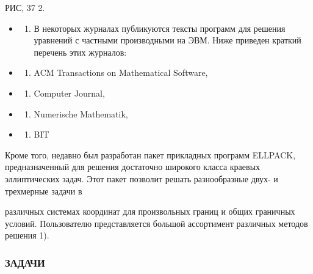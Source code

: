 \documentclass[
  ukrainian,
]{article}
\providecommand{\tightlist}{%
  \setlength{\itemsep}{0pt}\setlength{\parskip}{0pt}}
\begin{document}
РИС, 37 2.

\begin{itemize}
\tightlist
\item
  \begin{enumerate}
  \def\labelenumi{\arabic{enumi}.}
  \setcounter{enumi}{6}
  \tightlist
  \item
    В некоторых журналах публикуются тексты программ для решения
    уравнений с частными производными на ЭВМ. Ниже приведен краткий
    перечень этих журналов:
  \end{enumerate}
\item
  \begin{enumerate}
  \def\labelenumi{\alph{enumi})}
  \tightlist
  \item
    ACM Transactions on Mathematical Software,
  \end{enumerate}
\item
  \begin{enumerate}
  \def\labelenumi{\arabic{enumi})}
  \setcounter{enumi}{5}
  \tightlist
  \item
    Computer Journal,
  \end{enumerate}
\item
  \begin{enumerate}
  \def\labelenumi{\Alph{enumi})}
  \setcounter{enumi}{1}
  \tightlist
  \item
    Numerische Mathematik,
  \end{enumerate}
\item
  \begin{enumerate}
  \def\labelenumi{\alph{enumi})}
  \setcounter{enumi}{17}
  \tightlist
  \item
    BIT
  \end{enumerate}
\end{itemize}

Кроме того, недавно был разработан пакет прикладных программ ELLPACK,
предназначенный для решения достаточно широкого класса краевых
эллиптических задач. Этот пакет позволит решать разнообразные двух- и
трехмерные задачи в

различных системах координат для произвольных границ и общих граничных
условий. Пользователю представляется большой ассортимент различных
методов решения 1).

\subsubsection{ЗАДАЧИ}\label{ux437ux430ux434ux430ux447ux438-16}
\end{document}
